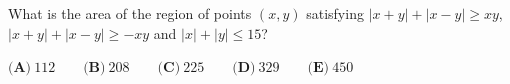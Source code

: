 What is the area of the region of points $(x,y)$ satisfying $|x+y|+|x-y|\ge xy$, $|x+y|+|x-y|\ge-xy$ and $|x|+|y|\le15$?

$\textbf{(A)}\ 112\qquad\textbf{(B)}\ 208\qquad\textbf{(C)}\ 225\qquad\textbf{(D)}\ 329\qquad\textbf{(E)}\ 450$
